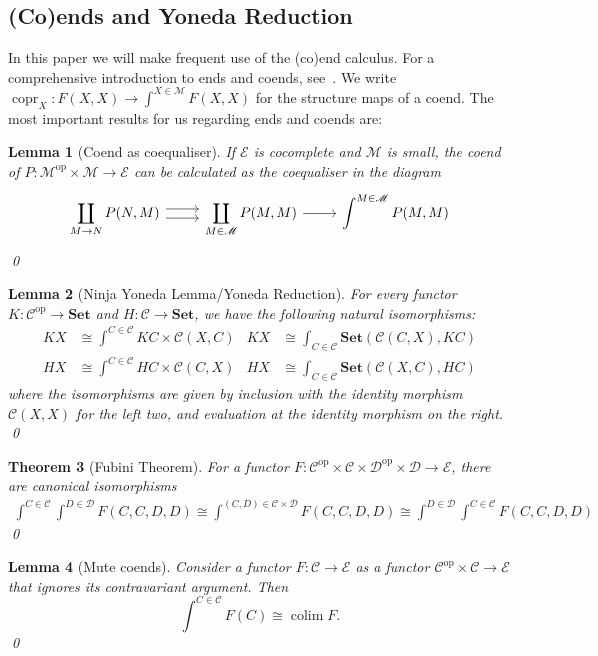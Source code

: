 \documentclass[11pt,letterpaper]{article}
\theoremstyle{plain}
\newtheorem{theorem}{Theorem}[subsection]
\newtheorem{lemma}[theorem]{Lemma}
\theoremstyle{definition}
\newcommand{\C}{\mathscr{C}}
\newcommand{\D}{\mathscr{D}}
\newcommand{\E}{\mathscr{E}}
\newcommand{\M}{\mathscr{M}}
\newcommand{\Set}{\mathbf{Set}}
\newcommand{\op}{\mathrm{op}}
\DeclareMathOperator{\copr}{copr}
\DeclareMathOperator*{\colim}{\mathrm{colim}}
\begin{document}
\subsection{(Co)ends and Yoneda Reduction}

In this paper we will make frequent use of the (co)end calculus. For a comprehensive introduction to ends and coends, see~\cite{CoendCofriend}. We write $\copr_X : F(X, X) \to \int^{X \in \M} F(X, X)$ for the structure maps of a coend. The most important results for us regarding ends and coends are:

\begin{lemma}[Coend as coequaliser]\label{lemma:calculate-coend}
If $\E$ is cocomplete and $\M$ is small, the coend of $P : \M^\op \times \M \to \E$ can be calculated as the coequaliser in the diagram
\[
  \begin{tikzcd}
    \displaystyle \coprod_{M \to N} P(N, M) \ar[r,shift left=.75ex]  \ar[r,shift right=.75ex] & \displaystyle\coprod_{M \in \M} P(M, M) \ar[r] & \displaystyle\int^{M \in \M} P(M, M)
  \end{tikzcd}
\]
\qed
\end{lemma}

\begin{lemma}[Ninja Yoneda Lemma/Yoneda Reduction]\label{lem:yoneda-reduction}
For every functor $K : \C^\op \to \Set$ and $H : \C \to \Set$, we have the following natural isomorphisms:
\begin{align*}
KX &\cong \int^{C \in \C} KC \times \C(X,C) &
KX &\cong \int_{C \in \C} \Set(\C(C,X), KC) \\
HX &\cong \int^{C \in \C} HC \times \C(C,X)  &
HX &\cong \int_{C \in \C} \Set(\C(X,C), HC)
\end{align*}
where the isomorphisms are given by inclusion with the identity morphism $\C(X, X)$ for the left two, and evaluation at the identity morphism on the right.
\qed
\end{lemma}

\begin{theorem}[Fubini Theorem]
For a functor $F : \C^\op \times \C \times \D^\op \times \D \to \E$, there are canonical isomorphisms
\begin{align*}
\int^{C \in \C} \int^{D \in \D} F(C,C,D,D) \cong \int^{(C,D) \in \C \times \D} F(C,C,D,D) \cong \int^{D \in \D} \int^{C \in \C} F(C,C,D,D)
\end{align*}
\qed
\end{theorem}

\begin{lemma}[Mute coends]
Consider a functor $F : \C \to \E$ as a functor $\C^\op \times \C \to \E$ that ignores its contravariant argument. Then \[ \int^{C \in \C} F(C) \cong \colim F. \] \qed
\end{lemma}
\end{document}

